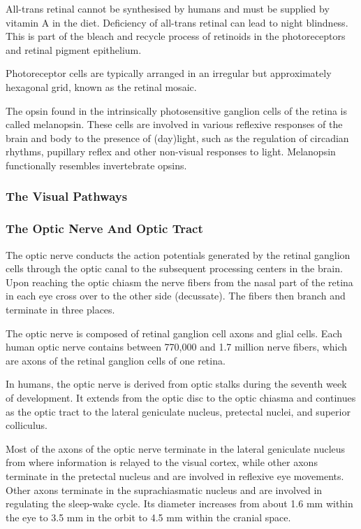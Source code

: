 All-trans retinal cannot be synthesised by humans and must be supplied
by vitamin A in the diet. Deficiency of all-trans retinal can lead to
night blindness. This is part of the bleach and recycle process of
retinoids in the photoreceptors and retinal pigment epithelium.

Photoreceptor cells are typically arranged in an irregular but
approximately hexagonal grid, known as the retinal mosaic.

The opsin found in the intrinsically photosensitive ganglion cells of
the retina is called melanopsin. These cells are involved in various
reflexive responses of the brain and body to the presence of (day)light,
such as the regulation of circadian rhythms, pupillary reflex and other
non-visual responses to light. Melanopsin functionally resembles
invertebrate opsins.

\hypertarget{the-visual-pathways}{%
\subsubsection{The Visual Pathways}\label{the-visual-pathways}}

\hypertarget{the-optic-nerve-and-optic-tract}{%
\subsubsection{The Optic Nerve And Optic
Tract}\label{the-optic-nerve-and-optic-tract}}

The optic nerve conducts the action potentials generated by the retinal
ganglion cells through the optic canal to the subsequent processing
centers in the brain. Upon reaching the optic chiasm the nerve fibers
from the nasal part of the retina in each eye cross over to the other
side (decussate). The fibers then branch and terminate in three places.

The optic nerve is composed of retinal ganglion cell axons and glial
cells. Each human optic nerve contains between 770,000 and 1.7 million
nerve fibers, which are axons of the retinal ganglion cells of one
retina.

In humans, the optic nerve is derived from optic stalks during the
seventh week of development. It extends from the optic disc to the optic
chiasma and continues as the optic tract to the lateral geniculate
nucleus, pretectal nuclei, and superior colliculus.

Most of the axons of the optic nerve terminate in the lateral geniculate
nucleus from where information is relayed to the visual cortex, while
other axons terminate in the pretectal nucleus and are involved in
reflexive eye movements. Other axons terminate in the suprachiasmatic
nucleus and are involved in regulating the sleep-wake cycle. Its
diameter increases from about 1.6 mm within the eye to 3.5 mm in the
orbit to 4.5 mm within the cranial space.

